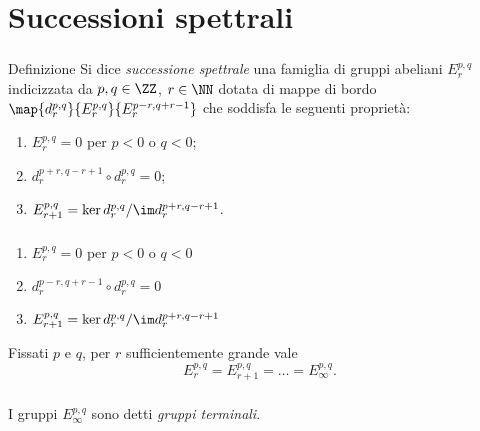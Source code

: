 \section{Successioni spettrali}
\newcommand*{\sseqOne}{\(E^{p,q}_r=0\) per \(p<0\) o \(q<0\)}
\newcommand*{\sseqTwo}{\(d^{p-r,q+r-1}_r\circ d^{p,q}_r=0\)}
\newcommand*{\sseqThree}{\(E^{p,q}_{r+1}=\ker d^{p,q}_r/\im d^{p+r,q-r+1}_r\)}
\begin{frame}
\frametitle{\secname}
\begin{block}{Definizione}
Si dice \emph{successione spettrale} una famiglia di gruppi abeliani \(E^{p,q}_r\) indicizzata da \(p,q\in\ZZ\), \(r\in\NN\) dotata di mappe di bordo \(\map{d^{p,q}_r}{E^{p,q}_r}{E^{p-r,q+r-1}_r}\) che soddisfa le seguenti proprietà:
\begin{enumerate}
\item \sseqOne;
\item \(d^{p+r,q-r+1}_r\circ d^{p,q}_r=0\);
\item \(E^{p,q}_{r+1}=\ker d^{p,q}_r/\im d^{p+r,q-r+1}_r\).
\end{enumerate}
\end{block}
\end{frame}
\begin{frame}
\frametitle{\secname}
\begin{overprint}
\begin{enumerate}
\item \sseqOne\vphantom{\sseqTwo}
\end{enumerate}
\begin{enumerate}
\setcounter{enumi}{1}
\item \sseqTwo
\end{enumerate}
\begin{enumerate}
\setcounter{enumi}{2}
\item \sseqThree
\end{enumerate}
Fissati \(p\) e \(q\), per \(r\) sufficientemente grande vale
\vspace{-10pt}
\[
E^{p,q}_r=E^{p,q}_{r+1}=\ldots=E^{p,q}_\infty.
\]
\end{overprint}
\vfill
\begin{overprint}
\centering{}
\centering{}
\centering{}
\centering{}
\end{overprint}
\end{frame}
\begin{frame}
\frametitle{\secname}
I gruppi $E^{p,q}_\infty$ sono detti \emph{gruppi terminali}.
\vspace{0.5cm}
\end{frame}
